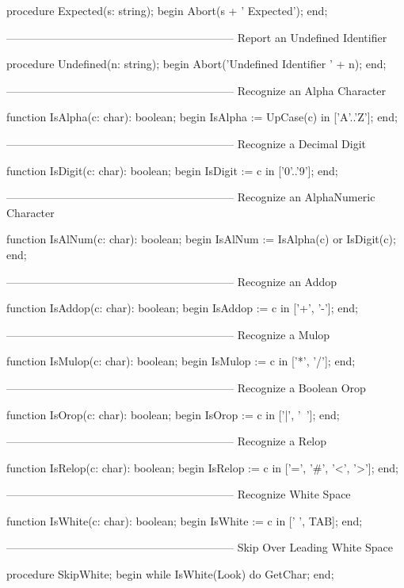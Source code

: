 \documentclass[float=false, crop=false]{standalone}
\begin{document}
\begin{code}
procedure Expected(s: string);
begin
   Abort(s + ' Expected');
end;

{--------------------------------------------------------------}
{ Report an Undefined Identifier }

procedure Undefined(n: string);
begin
   Abort('Undefined Identifier ' + n);
end;


{--------------------------------------------------------------}
{ Recognize an Alpha Character }

function IsAlpha(c: char): boolean;
begin
   IsAlpha := UpCase(c) in ['A'..'Z'];
end;


{--------------------------------------------------------------}
{ Recognize a Decimal Digit }

function IsDigit(c: char): boolean;
begin
   IsDigit := c in ['0'..'9'];
end;


{--------------------------------------------------------------}
{ Recognize an AlphaNumeric Character }

function IsAlNum(c: char): boolean;
begin
   IsAlNum := IsAlpha(c) or IsDigit(c);
end;


{--------------------------------------------------------------}
{ Recognize an Addop }

function IsAddop(c: char): boolean;
begin
   IsAddop := c in ['+', '-'];
end;


{--------------------------------------------------------------}
{ Recognize a Mulop }

function IsMulop(c: char): boolean;
begin
   IsMulop := c in ['*', '/'];
end;


{--------------------------------------------------------------}
{ Recognize a Boolean Orop }

function IsOrop(c: char): boolean;
begin
   IsOrop := c in ['|', '~'];
end;


{--------------------------------------------------------------}
{ Recognize a Relop }

function IsRelop(c: char): boolean;
begin
   IsRelop := c in ['=', '#', '<', '>'];
end;


{--------------------------------------------------------------}
{ Recognize White Space }

function IsWhite(c: char): boolean;
begin
   IsWhite := c in [' ', TAB];
end;


{--------------------------------------------------------------}
{ Skip Over Leading White Space }

procedure SkipWhite;
begin
   while IsWhite(Look) do
      GetChar;
end;



\end{code}
\end{document}
